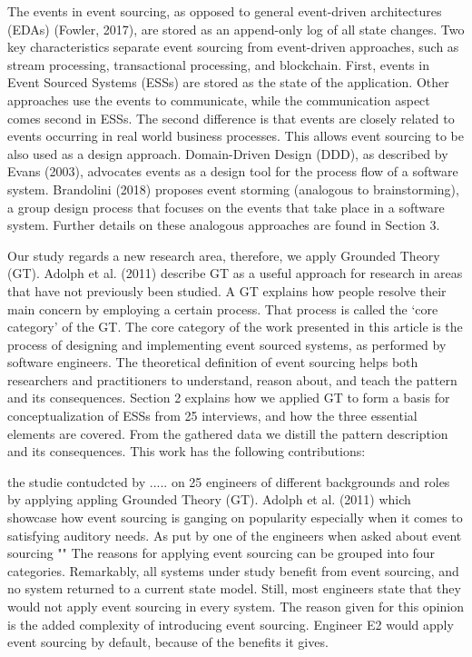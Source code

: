 The events in event sourcing, as opposed to general event-driven architectures (EDAs) (Fowler, 2017), are stored as an append-only log of all state changes. Two key characteristics separate event sourcing from event-driven approaches, such as stream processing, transactional processing, and blockchain. First, events in Event Sourced Systems (ESSs) are stored as the state of the application. Other approaches use the events to communicate, while the communication aspect comes second in ESSs. The second difference is that events are closely related to events occurring in real world business processes. This allows event sourcing to be also used as a design approach. Domain-Driven Design (DDD), as described by Evans (2003), advocates events as a design tool for the process flow of a software system. Brandolini (2018) proposes event storming (analogous to brainstorming), a group design process that focuses on the events that take place in a software system. Further details on these analogous approaches are found in Section 3.


Our study regards a new research area, therefore, we apply Grounded Theory (GT). Adolph et al. (2011) describe GT as a useful approach for research in areas that have not previously been studied. A GT explains how people resolve their main concern by employing a certain process. That process is called the ‘core category’ of the GT. The core category of the work presented in this article is the process of designing and implementing event sourced systems, as performed by software engineers. The theoretical definition of event sourcing helps both researchers and practitioners to understand, reason about, and teach the pattern and its consequences. Section 2 explains how we applied GT to form a basis for conceptualization of ESSs from 25 interviews, and how the three essential elements are covered. From the gathered data we distill the pattern description and its consequences. This work has the following contributions:


the studie contudcted by ..... on 25 engineers of different backgrounds and roles by applying appling Grounded Theory (GT). Adolph et al. (2011) which showcase how event sourcing is ganging on popularity especially when it comes to satisfying auditory needs. As put by one of the engineers when asked about event sourcing ""
The reasons for applying event sourcing can be grouped into four categories. Remarkably, all systems under study benefit from event sourcing, and no system returned to a current state model. Still, most engineers state that they would not apply event sourcing in every system. The reason given for this opinion is the added complexity of introducing event sourcing. Engineer E2 would apply event sourcing by default, because of the benefits it gives.~\citep{OVEREEM2021110970}


